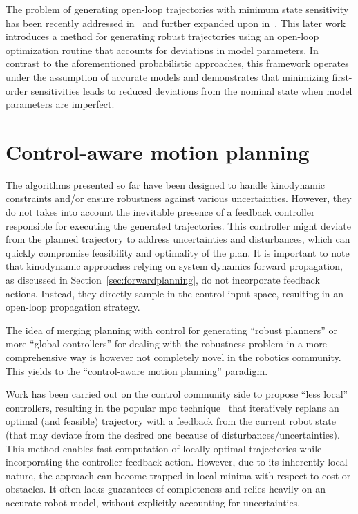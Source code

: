 The problem of generating open-loop trajectories with minimum state sensitivity has been recently addressed in~\cite{cSensi1} and further expanded upon in~\cite{cSensi2}. 
This later work introduces a method for generating robust trajectories using an open-loop optimization routine that accounts for deviations in model parameters. 
In contrast to the aforementioned probabilistic approaches, this framework operates under the assumption of accurate models and demonstrates that minimizing first-order sensitivities leads to reduced deviations from the nominal state when model parameters are imperfect.

\section{Control-aware motion planning}

The algorithms presented so far have been designed to handle kinodynamic constraints and/or ensure robustness against various uncertainties.
However, they do not takes into account the inevitable presence of a feedback controller responsible for executing the generated trajectories. 
This controller might deviate from the planned trajectory to address uncertainties and disturbances, which can quickly compromise feasibility and optimality of the plan.
It is important to note that kinodynamic approaches relying on system dynamics forward propagation, as discussed in Section~\ref{sec:forwardplanning}, do not incorporate feedback actions.
Instead, they directly sample in the control input space, resulting in an open-loop propagation strategy.

The idea of merging planning with control for generating ``robust planners'' or more ``global controllers'' for dealing with the robustness problem in a more comprehensive way is however not completely novel in the robotics community.
This yields to the ``control-aware motion planning'' paradigm.

Work has been carried out on the control community side to propose ``less local'' controllers, resulting in the popular \gls{mpc} technique~\cite{cMPC} that iteratively replans an optimal (and feasible) trajectory with a feedback from the current robot state (that may deviate from the desired one because of disturbances/uncertainties). 
This method enables fast computation of locally optimal trajectories while incorporating the controller feedback action. 
However, due to its inherently local nature, the  approach can become trapped in local minima with respect to cost or obstacles. 
It often lacks guarantees of completeness and relies heavily on an accurate robot model, without explicitly accounting for uncertainties.

